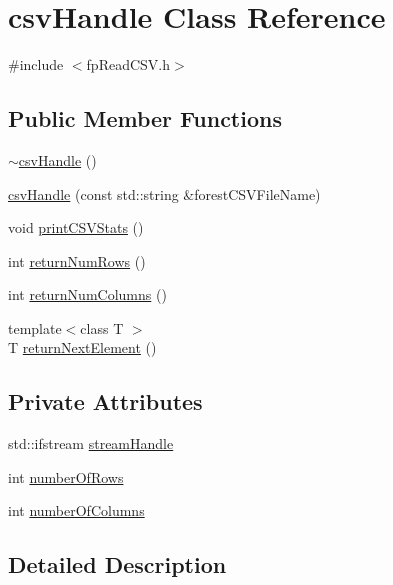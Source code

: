 \hypertarget{classcsvHandle}{}\section{csv\+Handle Class Reference}
\label{classcsvHandle}


{\ttfamily \#include $<$fp\+Read\+C\+S\+V.\+h$>$}

\subsection*{Public Member Functions}
\begin{DoxyCompactItemize}
\item 
\hyperlink{classcsvHandle_add81ffc45990b6b8c1288a307581c1c8}{$\sim$csv\+Handle} ()
\item 
\hyperlink{classcsvHandle_a8e4a197ecf07b72406c6c5125606f598}{csv\+Handle} (const std\+::string \&forest\+C\+S\+V\+File\+Name)
\item 
void \hyperlink{classcsvHandle_a571c2b5fcec86782f43b18dab07c9c26}{print\+C\+S\+V\+Stats} ()
\item 
int \hyperlink{classcsvHandle_a605aeef90b440e8c7b090999da3739a8}{return\+Num\+Rows} ()
\item 
int \hyperlink{classcsvHandle_a7dc362efe916e5a9707f26ad20d3c870}{return\+Num\+Columns} ()
\item 
{\footnotesize template$<$class T $>$ }\\T \hyperlink{classcsvHandle_a28f8ee0fa06f1c78132b3551da272bde}{return\+Next\+Element} ()
\end{DoxyCompactItemize}
\subsection*{Private Attributes}
\begin{DoxyCompactItemize}
\item 
std\+::ifstream \hyperlink{classcsvHandle_ab2900581db37409635ccfd878693fb48}{stream\+Handle}
\item 
int \hyperlink{classcsvHandle_a61b2327480d1685e7fd64d4cba139ac5}{number\+Of\+Rows}
\item 
int \hyperlink{classcsvHandle_aee792b10c2ad6e21c68cfe84d6b7ff46}{number\+Of\+Columns}
\end{DoxyCompactItemize}


\subsection{Detailed Description}


